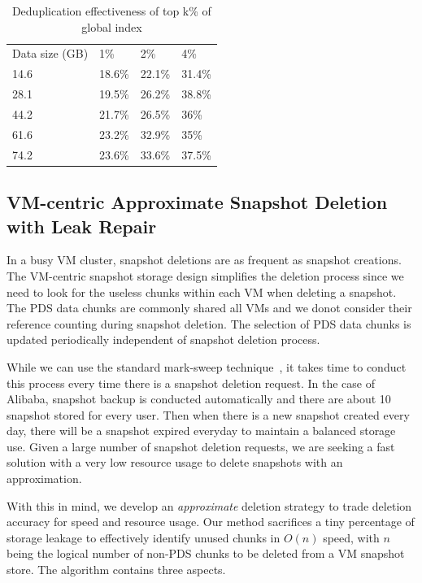 {\begin{table}
    \begin{tabular}{llll}
    Data size (GB) & 1\%    & 2\%    & 4\%    \\
    14.6           & 18.6\% & 22.1\% & 31.4\% \\
    28.1           & 19.5\% & 26.2\% & 38.8\% \\
    44.2           & 21.7\% & 26.5\% & 36\%   \\
    61.6           & 23.2\% & 32.9\% & 35\%   \\
    74.2           & 23.6\% & 33.6\% & 37.5\% \\
    \end{tabular}
    \caption{Deduplication effectiveness of top k\% of global index}
    \label{tab:cds}
\end{table}

}

\subsection{ VM-centric Approximate Snapshot Deletion with Leak Repair}

In a busy VM cluster, snapshot deletions are as frequent as snapshot creations.
The VM-centric snapshot storage design simplifies the deletion process since we need to look
for the useless chunks within each VM when deleting a snapshot.
The PDS data chunks are commonly shared all VMs and we donot consider their reference
counting  during snapshot deletion.
The selection of PDS data chunks   is updated periodically independent of snapshot deletion process.

While we can use the standard mark-sweep technique~\cite{mark-sweep}, 
it takes time to conduct this process every time there is a snapshot deletion request.
In the case of Alibaba, snapshot backup is conducted automatically and there are 
about 10 snapshot stored for  every user. Then when there is
a new snapshot created every day,  there will be  a snapshot expired everyday to maintain
a balanced storage use. Given a large number of snapshot deletion requests, we are seeking
a fast solution with a very low resource usage to delete snapshots with an approximation.

With this in mind, we develop an {\em approximate} deletion strategy to trade deletion accuracy for
speed and resource usage. Our method sacrifices a tiny percentage of storage leakage
to effectively identify unused chunks in $O(n)$ speed, with $n$ being the logical number of non-PDS chunks 
to be deleted from a VM snapshot store.
The algorithm contains three aspects.


